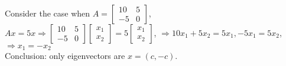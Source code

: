 \documentclass{article}
\begin{document}
\\
Consider the case when $A =
    \begin{bmatrix}
        10 & 5 \\
        -5 & 0
    \end{bmatrix}$,
    $Ax = 5x \Rightarrow
    \begin{bmatrix}
        10 & 5 \\
        -5 & 0
    \end{bmatrix} \begin{bmatrix}
        x_1 \\
        x_2
    \end{bmatrix}  = 5\begin{bmatrix}
        x_1 \\
        x_2
    \end{bmatrix}$,
    $\Rightarrow 10x_1 + 5x_2 = 5x_1, -5x_1 = 5x_2$,
    $\Rightarrow x_1 = -x_2$
\\
Conclusion: only eigenvectors are $x = (c, -c)$.
\end{document}
